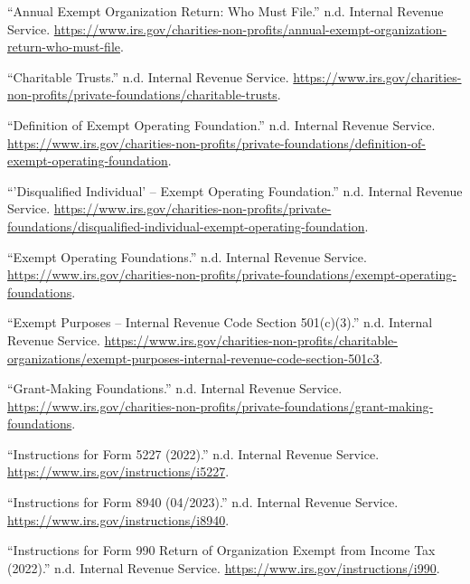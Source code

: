\documentclass[
  letterpaper,
  DIV=11,
  numbers=noendperiod,
  oneside]{scrreprt}
\newlength{\cslhangindent}
\newlength{\cslentryspacingunit} %
\newenvironment{CSLReferences}[2] %
 {%
  \setlength{\parindent}{0pt}
  \ifodd #1
  \let\oldpar\par
  \def\par{\hangindent=\cslhangindent\oldpar}
  \fi
  \setlength{\parskip}{#2\cslentryspacingunit}
 }%
 {}
\begin{document}
\hypertarget{refs}{}
\begin{CSLReferences}{1}{0}
\leavevmode{}%
{``Annual Exempt Organization Return: Who Must File.''} n.d. Internal
Revenue Service.
\url{https://www.irs.gov/charities-non-profits/annual-exempt-organization-return-who-must-file}.

\leavevmode{}%
{``Charitable Trusts.''} n.d. Internal Revenue Service.
\url{https://www.irs.gov/charities-non-profits/private-foundations/charitable-trusts}.

\leavevmode{}%
{``Definition of Exempt Operating Foundation.''} n.d. Internal Revenue
Service.
\url{https://www.irs.gov/charities-non-profits/private-foundations/definition-of-exempt-operating-foundation}.

\leavevmode{}%
{``'Disqualified Individual' -- Exempt Operating Foundation.''} n.d.
Internal Revenue Service.
\url{https://www.irs.gov/charities-non-profits/private-foundations/disqualified-individual-exempt-operating-foundation}.

\leavevmode{}%
{``Exempt Operating Foundations.''} n.d. Internal Revenue Service.
\url{https://www.irs.gov/charities-non-profits/private-foundations/exempt-operating-foundations}.

\leavevmode{}%
{``Exempt Purposes -- Internal Revenue Code Section 501(c)(3).''} n.d.
Internal Revenue Service.
\url{https://www.irs.gov/charities-non-profits/charitable-organizations/exempt-purposes-internal-revenue-code-section-501c3}.

\leavevmode{}%
{``Grant-Making Foundations.''} n.d. Internal Revenue Service.
\url{https://www.irs.gov/charities-non-profits/private-foundations/grant-making-foundations}.

\leavevmode{}%
{``Instructions for Form 5227 (2022).''} n.d. Internal Revenue Service.
\url{https://www.irs.gov/instructions/i5227}.

\leavevmode{}%
{``Instructions for Form 8940 (04/2023).''} n.d. Internal Revenue
Service. \url{https://www.irs.gov/instructions/i8940}.

\leavevmode{}%
{``Instructions for Form 990 Return of Organization Exempt from Income
Tax (2022).''} n.d. Internal Revenue Service.
\url{https://www.irs.gov/instructions/i990}.


\end{CSLReferences}
\end{document}
